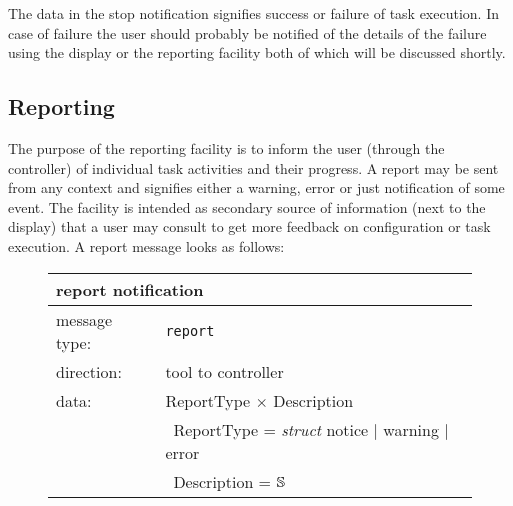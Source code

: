\documentclass{article}
\newcommand{\msg}[1]{\texttt{#1}}
\newcommand{\String}{\ensuremath \mathbb{S}\xspace}
\begin{document}
   \noindent The data in the stop notification signifies success or failure
   of task execution. In case of failure the user should probably be notified
   of the details of the failure using the display or the reporting facility
   both of which will be discussed shortly.
   
  \pagebreak
  \subsection{Reporting}

   The purpose of the reporting facility is to inform the user (through the
   controller) of individual task activities and their progress. A report may
   be sent from any context and signifies either a warning, error or just
   notification of some event. The facility is intended as secondary source of
   information (next to the display) that a user may consult to get more
   feedback on configuration or task execution. A report message looks as follows:
   
   \begin{figure}[H]
    \begin{center}
     \begin{tabular}{|ll|}
      \hline
       \multicolumn{2}{|l|}{\textbf{report notification}} \\
      \hline
       message type:   & \msg{report} \\
      \hline
       direction:      & tool to controller \\
      \hline
       data:           & ReportType $\times$ Description \\
                       & \ ReportType = \textit{struct} notice $|$ warning $|$ error \\
                       & \ Description = $\String$ \\
      \hline
     \end{tabular}
    \end{center}
   \end{figure}
   \vspace{-0.3cm}
\end{document}

